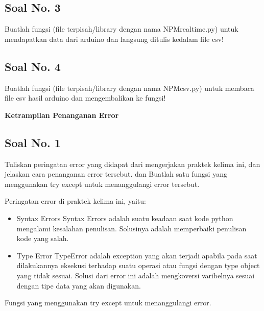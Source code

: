 \subsection{Soal No. 3}
Buatlah  fungsi  (file  terpisah/library  dengan  nama  NPMrealtime.py) untuk mendapatkan data dari arduino dan langsung ditulis kedalam file csv!



\subsection{Soal No. 4}
Buatlah fungsi (file terpisah/library dengan nama NPMcsv.py) untuk membaca file csv hasil arduino dan mengembalikan ke fungsi!


\hfill \break
{\Large \textbf{Ketrampilan Penanganan Error}}

\subsection{Soal No. 1}
Tuliskan  peringatan  error  yang  didapat  dari  mengerjakan  praktek  kelima  ini, dan  jelaskan  cara  penanganan  error  tersebut.   dan  Buatlah  satu  fungsi  yang menggunakan try except untuk menanggulangi error tersebut.

\hfill \break
Peringatan error di praktek kelima ini, yaitu:
\begin{itemize}
	\item Syntax Errors
	Syntax Errors adalah suatu keadaan saat kode python mengalami kesalahan penulisan. Solusinya adalah memperbaiki penulisan kode yang salah.
		
	\item Type Error
	TypeError adalah exception yang akan terjadi apabila pada saat dilakukannya eksekusi terhadap suatu operasi atau fungsi dengan type object yang tidak sesuai. Solusi dari error ini adalah mengkoversi varibelnya sesuai dengan tipe data yang akan digunakan.
\end{itemize}

\hfill \break
Fungsi yang menggunakan try except untuk menanggulangi error.




